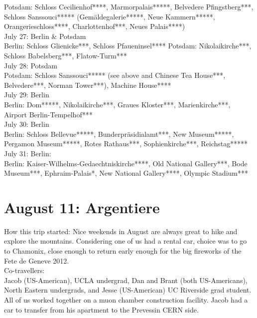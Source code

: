 Potsdam: Schloss Cecilienhof****, Marmorpalais*****, Belvedere Pfingstberg***, Schloss Sanssouci***** (Gem\"aldegalerie*****, Neue Kammern*****, Orangerieschloss****, Charlottenhof***, Neues Palais****)\\

July 27: Berlin \& Potsdam\\
Berlin: Schloss Glienicke***, Schloss Pfaueninsel****
Potsdam: Nikolaikirche***, Schloss Babelsberg***, Flatow-Turm***\\

July 28: Potsdam\\
Potsdam: Schloss Sanssouci***** (see above and Chinese Tea House***, Belvedere***, Norman Tower***), Machine House****\\

July 29: Berlin\\
Berlin: Dom*****, Nikolaikirche***, Graues Kloster***, Marienkirche***, Airport Berlin-Tempelhof***\\

July 30: Berlin\\
Berlin: Schloss Bellevue*****, Bunderpr\"asidialamt***, New Museum*****, Pergamon Museum*****, Rotes Rathaus***, Sophienkirche***, Reichstag*****\\

July 31: Berlin:\\
Berlin: Kaiser-Wilhelms-Gedaechtniskirche****, Old National Gallery***, Bode Museum***, Ephraim-Palais*, New National Gallery****, Olympic Stadium***

\section{August 11: Argentiere}
\label{Argentiere2012}

How this trip started: Nice weekends in August are always great to hike and explore the mountains. Considering one of us had a rental car, choice was to go to Chamonix, close enough to return early enough for the big fireworks of the Fete de Geneve 2012.\\

Co-travellers:\\
Jacob (US-American), UCLA undergrad, Dan and Brant (both US-Americans), North Eastern undergrads, and Jesse (US-American) UC Riverside grad student. All of us worked together on a muon chamber construction facility. Jacob had a car to transfer from his apartment to the Prevessin CERN side.\\

